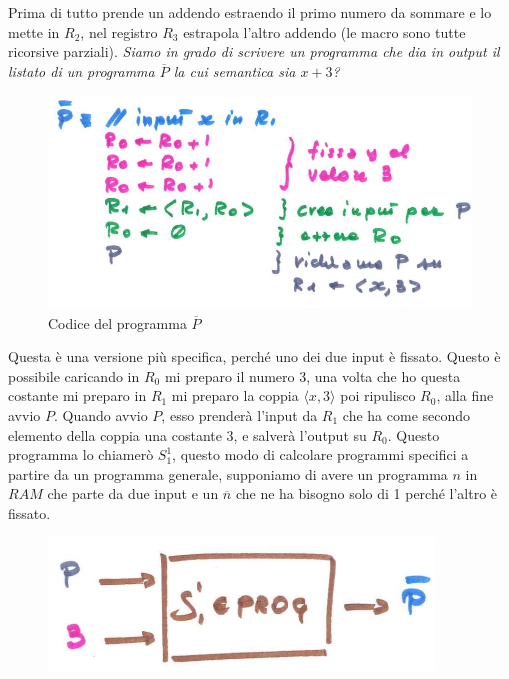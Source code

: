 \documentclass{article}
\begin{document}
\begin{enumerate}
          Prima di tutto prende un addendo estraendo il primo numero da sommare e lo mette in $R_2$,
          nel registro $R_3$ estrapola l'altro addendo (le macro sono tutte ricorsive parziali). \textit{Siamo
              in grado di scrivere un programma che dia in output il listato di un programma $\overline{P}$
              la cui semantica sia $x+3$?}
          \begin{figure}[H]
              \centering
              \includegraphics[scale=0.5]{images/programma_pseg.png}
              \caption{Codice del programma $\overline{P}$}
          \end{figure}
          Questa è una versione più specifica, perché uno dei due input è
          fissato. Questo è possibile caricando in $R_0$ mi preparo il numero 3, una volta che ho questa costante
          mi preparo in $R_1$ mi preparo la coppia $\langle x,3\rangle$ poi ripulisco $R_0$, alla fine avvio $P$.
          Quando avvio $P$, esso prenderà l'input da $R_1$ che ha come secondo elemento della coppia una costante 3,
          e salverà l'output su $R_0$. Questo programma lo chiamerò $S_1^1$, questo modo di calcolare
          programmi specifici a partire da un programma generale, supponiamo di avere un programma $n$
          in $RAM$ che parte da due input e un $\overline{n}$ che ne ha bisogno solo di 1 perché l'altro
          è fissato.

          \begin{figure}[H]
              \centering
              \includegraphics[scale=0.5]{images/psegnato.png}
          \end{figure}


\end{enumerate}
\end{document}
